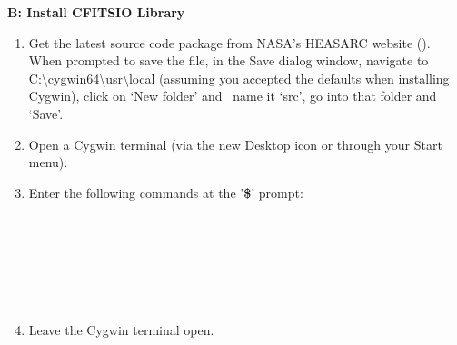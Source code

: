 \documentclass[12pt,twoside]{article}
\begin{document}
\textbf{B: Install CFITSIO Library}
\begin{enumerate}
	\setlength{\itemsep}{-1pt}
	\setlength{\parsep}{-10pt}
\item
  Get the latest source code package from NASA's HEASARC website
  ().
  When prompted to save the file, in the Save dialog window, navigate to
  C:\textbackslash{}cygwin64\textbackslash{}usr\textbackslash{}local
  (assuming you accepted the defaults when installing Cygwin), click on
  `New folder' and~ name it `src', go into that folder and `Save'.
\item
  Open a Cygwin terminal (via the new Desktop icon or through your Start
  menu).
\item
  Enter the following commands at the '\textbf{\$}' prompt:\\
  \\ 
  \\ 
  \\ 
  \\ 
  \\ 
  \\ 
\item
  Leave the Cygwin terminal open.
\end{enumerate}
\end{document}
